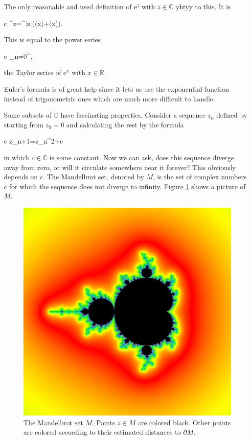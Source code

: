 \documentclass[11pt,oneside,%
]{memoir}
\newenvironment{eqna}{\begin{IEEEeqnarray}{c}}{\end{IEEEeqnarray}\ignorespacesafterend}
\theoremstyle{definition}
\newcommand{\RR}{\mathbb{R}}
\newcommand{\CC}{\mathbb{C}}
\newcommand{\ee}{\mathrm{e}}
\newcommand{\ii}{\mathrm{i}}
\begin{document}
The only reasonable and used definition of \(\ee^{z}\) with \(z\in\CC\) yhtyy to this. It is
\begin{eqna}
    \ee^{z}=\ee^{|z|}(\cos(x)+\ii\sin(x)).
\end{eqna}
This is equal to the power series
\begin{eqna}
    \sum_{n=0}^\infty{},
\end{eqna}
the Taylor series of \(\ee^{x}\) with \(x\in\RR\).

Euler's formula is of great help since it lets us use the exponential function instead of trigonometric ones which are much more difficult to handle.

Some subsets of \(\CC\) have fascinating properties. Consider a sequence \(z_n\) defined by starting from \(z_0=0\) and calculating the rest by the formula
\begin{eqna}
    z_{n+1}=z_n^2+c
\end{eqna}
in which \(c\in\CC\) is some constant. Now we can ask, does this sequence diverge away from zero, or will it circulate somewhere near it forever? This obviously depends on \(c\). The Mandelbrot set, denoted by \(M\), is the set of complex numbers \(c\) for which the sequence does not diverge to infinity. Figure \ref{mandelbrot_picture} shows a picture of \(M\).

\begin{figure}[ht]
    \centering
    \includegraphics[width=\textwidth,trim={230 530 570 530},clip]{graphics/mandelbrot.jpg}
    \caption{The Mandelbrot set \(M\). Points \(z\in M\) are colored black. Other points are colored according to their estimated distances to \(\partial M\).}
    \label{mandelbrot_picture}
\end{figure}
\end{document}
